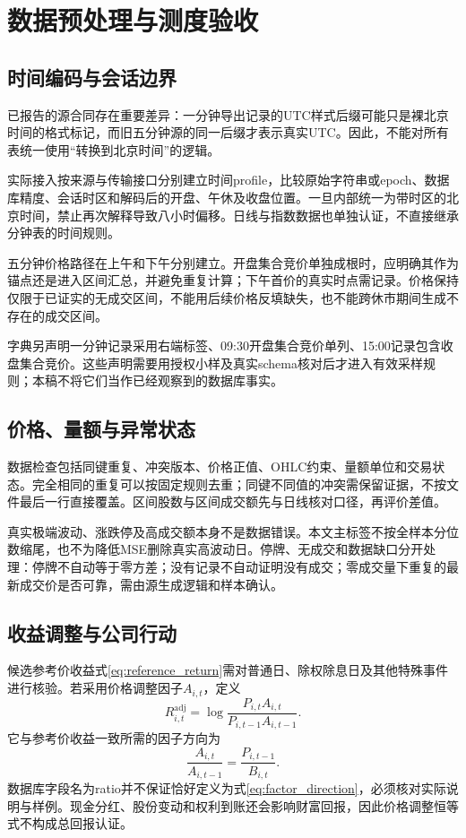 \section{数据预处理与测度验收}
\subsection{时间编码与会话边界}
已报告的源合同存在重要差异：一分钟导出记录的UTC样式后缀可能只是裸北京时间的格式标记，而旧五分钟源的同一后缀才表示真实UTC。因此，不能对所有表统一使用“转换到北京时间”的逻辑。

实际接入按来源与传输接口分别建立时间profile，比较原始字符串或epoch、数据库精度、会话时区和解码后的开盘、午休及收盘位置。一旦内部统一为带时区的北京时间，禁止再次解释导致八小时偏移。日线与指数数据也单独认证，不直接继承分钟表的时间规则。

五分钟价格路径在上午和下午分别建立。开盘集合竞价单独成根时，应明确其作为锚点还是进入区间汇总，并避免重复计算；下午首价的真实时点需记录。价格保持仅限于已证实的无成交区间，不能用后续价格反填缺失，也不能跨休市期间生成不存在的成交区间。

字典另声明一分钟记录采用右端标签、09:30开盘集合竞价单列、15:00记录包含收盘集合竞价。这些声明需要用授权小样及真实schema核对后才进入有效采样规则；本稿不将它们当作已经观察到的数据库事实。

\subsection{价格、量额与异常状态}
数据检查包括同键重复、冲突版本、价格正值、OHLC约束、量额单位和交易状态。完全相同的重复可以按固定规则去重；同键不同值的冲突需保留证据，不按文件最后一行直接覆盖。区间股数与区间成交额先与日线核对口径，再评价差值。

真实极端波动、涨跌停及高成交额本身不是数据错误。本文主标签不按全样本分位数缩尾，也不为降低MSE删除真实高波动日。停牌、无成交和数据缺口分开处理：停牌不自动等于零方差；没有记录不自动证明没有成交；零成交量下重复的最新成交价是否可靠，需由源生成逻辑和样本确认。

\subsection{收益调整与公司行动}
候选参考价收益式\eqref{eq:reference_return}需对普通日、除权除息日及其他特殊事件进行核验。若采用价格调整因子$A_{i,t}$，定义
\begin{equation}\label{eq:adjusted_return}
R^{\mathrm{adj}}_{i,t}=\log\frac{P_{i,t}A_{i,t}}{P_{i,t-1}A_{i,t-1}}.
\end{equation}
它与参考价收益一致所需的因子方向为
\begin{equation}\label{eq:factor_direction}
\frac{A_{i,t}}{A_{i,t-1}}=\frac{P_{i,t-1}}{B_{i,t}}.
\end{equation}
数据库字段名为ratio并不保证恰好定义为式\eqref{eq:factor_direction}，必须核对实际说明与样例。现金分红、股份变动和权利到账还会影响财富回报，因此价格调整恒等式不构成总回报认证。

